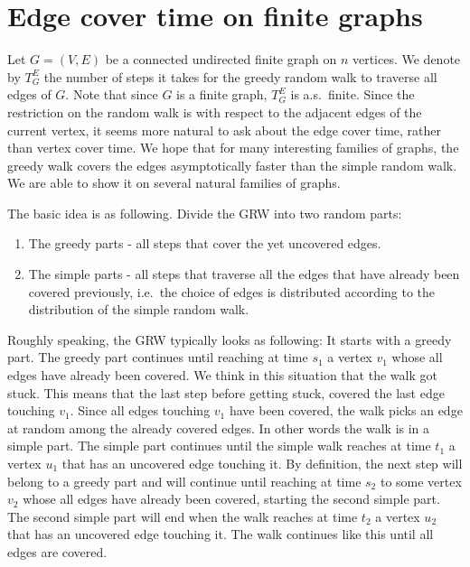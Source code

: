 \documentclass[12pt,a4paper]{article}
\newcommand{\0}{{\bf 0}}
\newcommand{\enumlist}[1]{\begin{enumerate}#1\end{enumerate}}
\begin{document}
\section{Edge cover time on finite graphs}\label{sec:edge_cover_time}

    Let $G=(V,E)$ be a connected undirected finite graph on $n$ vertices.
    We denote by $T^E_G$ the number of steps it takes for the greedy random walk to traverse all edges of $G$. Note that since $G$ is a finite graph, $T^E_G$ is a.s.\ finite.
    Since the restriction on the random walk is with respect to the adjacent edges of the current vertex,
    it seems more natural to ask about the edge cover time, rather than vertex cover time.
    We hope that for many interesting families of graphs, the greedy walk covers the edges asymptotically faster
    than the simple random walk. We are able to show it on several natural families of graphs.
    \medskip

    The basic idea is as following.
    Divide the GRW into two random parts:
    \enumlist{
        \item The greedy parts - all steps that cover the yet uncovered edges.
        \item The simple parts - all steps that traverse all the edges that have already been covered previously,
                                i.e.\ the choice of edges is distributed according to the distribution of the simple random walk.
    }

    Roughly speaking, the GRW typically looks as following: It starts with a greedy part. The greedy part continues until
    reaching at time $s_1$ a vertex $v_1$ whose all edges have already been covered.
    We think in this situation that the walk got stuck.
    This means that the last step before getting stuck, covered the last edge touching $v_1$.
    Since all edges touching $v_1$ have been covered, the walk picks an edge at random among the already covered edges.
    In other words the walk is in a simple part.
    The simple part continues until the simple walk reaches at time $t_1$ a vertex $u_1$ that has an uncovered edge touching it.
    By definition, the next step will belong to a greedy part and will continue until reaching at time $s_2$
    to some vertex $v_2$ whose all edges have already been covered, starting the second simple part.
    The second simple part will end when the walk reaches at time $t_2$ a vertex $u_2$ that has an uncovered edge touching it.
    The walk continues like this until all edges are covered.
\end{document}
